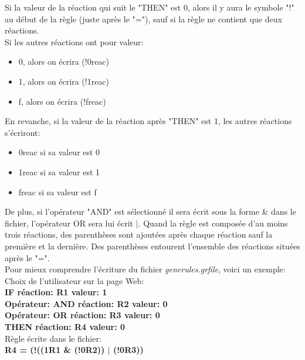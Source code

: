 Si la valeur de la réaction qui suit le "THEN" est 0, alors il y aura le symbole "!" au début de la règle (juste après le "="), sauf si la règle ne contient que deux réactions.\\
Si les autres réactions ont pour valeur:
\begin{itemize}
\item 0, alors on écrira (!0reac)
\item 1, alors on écrira (!1reac)
\item f, alors on écrira (!freac)
\end{itemize}
En revanche, si la valeur de la réaction après "THEN" est 1, les autres réactions s'écriront:
\begin{itemize}
\item 0reac si sa valeur est 0
\item 1reac si sa valeur est 1
\item freac si sa valeur est f
\end{itemize}
De plus, si l'opérateur "AND" est sélectionné il sera écrit sous la forme \& dans le fichier, l'opérateur OR sera lui écrit $|$. Quand la règle est composée d'au moins trois réactions, des parenthèses sont ajoutées après chaque réaction sauf la première et la dernière. Des parenthèses entourent l'ensemble des réactions situées après le "=".\\

Pour mieux comprendre l'écriture du fichier \emph{generules.grfile}, voici un exemple:\\
Choix de l'utilisateur sur la page Web:\\
\textbf{IF réaction: R1 valeur: 1\\
Opérateur: AND réaction: R2 valeur: 0\\
Opérateur: OR réaction: R3 valeur: 0\\
THEN réaction: R4 valeur: 0}\\

Règle écrite dans le fichier: \\
\textbf{R4 = (!((1R1 \& (!0R2)) $|$ (!0R3))}
